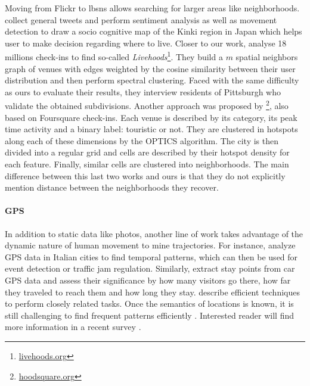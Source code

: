 Moving from Flickr to \glspl{lbsn} allows searching for larger areas like
neighborhoods. \Textcite{SocioMap12} collect general tweets and perform
sentiment analysis as well as movement detection to draw a socio cognitive map
of the Kinki region in Japan which helps user to make decision regarding where
to live. Closer to our work, \textcite{Livehoods12} analyse 18 millions
check-ins to find so-called
\emph{Livehoods}\footnote{\href{http://livehoods.org/}{\url{livehoods.org}}}.
They build a $m$ spatial neighbors graph of venues with edges weighted by the
cosine similarity between their user distribution and then perform spectral
clustering. Faced with the same difficulty as ours to evaluate their results,
they interview residents of Pittsburgh who validate the obtained subdivisions.
Another approach was proposed by
\textcite{Hoodsquare13}\footnote{\href{http://pizza.cl.cam.ac.uk/hoodsquare/}%
{\url{hoodsquare.org}}}, also based on Foursquare check-ins. Each venue is
described by its category, its peak time activity and a binary label:
touristic or not. They are clustered in hotspots along each of these dimensions
by the \textsc{OPTICS} algorithm. The city is then divided into a regular grid
and cells are described by their hotspot density for each feature.
 Finally, similar cells
are clustered into neighborhoods. The main difference between this last two
works and ours is that they do not explicitly mention distance between the
neighborhoods they recover.

\paragraph{GPS}

In addition to static data like photos, another line of work takes advantage
of the dynamic nature of human movement to mine trajectories. For instance,
\textcite{MAtlas11} analyze GPS data in Italian cities to find temporal
patterns, which can then be used for event detection or traffic jam
regulation. Similarly, \textcite{GPSStay10} extract stay points from car GPS
data and assess their significance by how many visitors go there, how far they
traveled to reach them and how long they stay. \Textcite{TrajROI11} describe
efficient techniques to perform closely related tasks. Once the semantics of
locations is known, it is still challenging to find frequent patterns
efficiently \autocite{SemanticTrajectories14}. Interested reader will find
more information in a recent survey \autocite{TrajSurvey13}.


